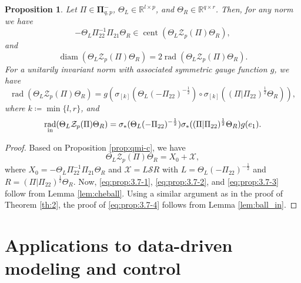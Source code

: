 \documentclass[pdflatex,sn-mathphys-num]{sn-jnl}%
\DeclareMathOperator{\rad}{rad}
\DeclareMathOperator{\cent}{cent}
\DeclareMathOperator{\diam}{diam}
\theoremstyle{thmstyleone}
\newtheorem{proposition}[theorem]{Proposition}
\begin{document}
\begin{proposition}
\label{prop:3.7}
Let $\Pi\in\pmb{\Pi}_{q,p}^-$, $\Theta_{L}\in\mathbb{R}^{l\times p}$, and $\Theta_{R}\in\mathbb{R}^{q\times r}$. Then, for any norm we have
\begin{equation}
\label{eq:prop:3.7-1}
-\Theta_L\Pi_{22}^{-1} \Pi_{21}\Theta_R\in\cent(\Theta_L\mathcal{Z}_{p}(\Pi)\Theta_R),
\end{equation}
and
\begin{equation}
\label{eq:prop:3.7-2}
\diam(\Theta_{L}\mathcal{Z}_{p}(\Pi)\Theta_{R})=2\rad (\Theta_{L}\mathcal{Z}_{p}(\Pi)\Theta_{R}).
\end{equation}
For a unitarily invariant norm with associated symmetric gauge function $g$, we have
\begin{equation}
\label{eq:prop:3.7-3}
\rad (\Theta_{L}\mathcal{Z}_{p}(\Pi)\Theta_{R})=g(\sigma_{[k]}(\Theta_{L}(-\Pi_{22})^{-\frac{1}{2}})\circ \sigma_{[k]}((\Pi|\Pi_{22})^{\frac{1}{2}}\Theta_{R})),
\end{equation} 
where $k\coloneqq\min\{l,r\}$, and
\begin{equation}
\label{eq:prop:3.7-4}
\rad_\textup{in} (\Theta_{L}\mathcal{Z}_{p}(\Pi)\Theta_{R})=\sigma_{*}(\Theta_{L}(-\Pi_{22})^{-\frac{1}{2}}) \sigma_{*}((\Pi|\Pi_{22})^{\frac{1}{2}}\Theta_{R})g(e_1).
\end{equation} 
\end{proposition}
\begin{proof}
Based on Proposition \ref{prop:qmi-c}, we have 
\begin{equation}
\Theta_{L}\mathcal{Z}_{p}(\Pi)\Theta_{R}=X_0+\mathcal{X},
\end{equation}
where $X_0=-\Theta_{L}\Pi_{22}^{-1} \Pi_{21}\Theta_{R}$ and $\mathcal{X}=L\mathcal{S}R$ with $L=\Theta_{L}(-\Pi_{22})^{-\frac{1}{2}}$ and $R=(\Pi|\Pi_{22})^{\frac{1}{2}}\Theta_{R}$. Now, \eqref{eq:prop:3.7-1}, \eqref{eq:prop:3.7-2}, and \eqref{eq:prop:3.7-3} follow from Lemma \ref{lem:cheball}. Using a similar argument as in the proof of Theorem \ref{th:2}, the proof of \eqref{eq:prop:3.7-4} follows from Lemma \ref{lem:ball_in}. 
\end{proof}

\section{Applications to data-driven modeling and control}
\label{sec:III}
\end{document}
